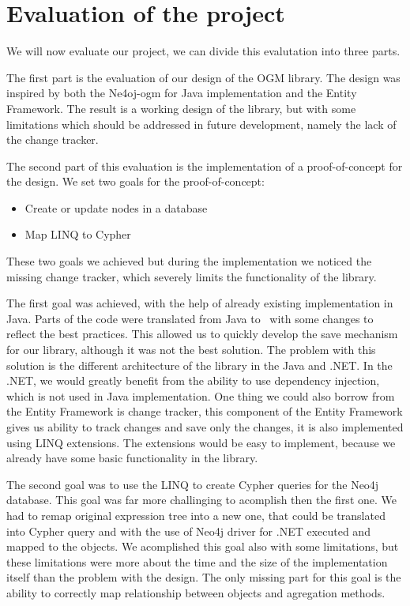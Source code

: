 \chapter{Evaluation of the project}

We will now evaluate our project, we can divide this evalutation into three parts.

The first part is the evaluation of our design of the OGM library. The design was inspired by both the Ne4oj-\acrshort{ogm} for Java implementation and the Entity Framework.
The result is a working design of the library, but with some limitations which should be addressed in future development, namely the lack of the change tracker.

The second part of this evaluation is the implementation of a proof-of-concept for the design.
We set two goals for the proof-of-concept:
\begin{itemize}
    \item {Create or update nodes in a database}
    \item {Map LINQ to Cypher}
\end{itemize}
These two goals we achieved but during the implementation we noticed the missing change tracker, which severely limits the functionality of the library.

The first goal was achieved, with the help of already existing implementation in Java. Parts of the code were translated from Java to \CS\ with some changes to reflect the best practices.
This allowed us to quickly develop the save mechanism for our library, although it was not the best solution.
The problem with this solution is the different architecture of the library in the Java and .NET.
In the .NET, we would greatly benefit from the ability to use dependency injection, which is not used in Java implementation.
One thing we could also borrow from the Entity Framework is change tracker, this component of the Entity Framework gives us ability to track changes and save only the changes, it is also implemented using LINQ extensions.
The extensions would be easy to implement, because we already have some basic functionality in the library.

The second goal was to use the LINQ to create Cypher queries for the Neo4j database.
This goal was far more challinging to acomplish then the first one.
We had to remap original expression tree into a new one, that could be translated into Cypher query and with the use of Neo4j driver for .NET executed and mapped to the objects.
We acomplished this goal also with some limitations, but these limitations were more about the time and the size of the implementation itself than the problem with the design.
The only missing part for this goal is the ability to correctly map relationship between objects and agregation methods.



